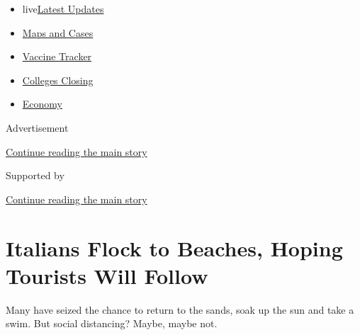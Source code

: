 \begin{itemize}
\tightlist
\item
  live\href{https://www.nytimes3xbfgragh.onion/2020/08/20/world/coronavirus-covid.html?name=styln-coronavirus-national\&region=TOP_BANNER\&variant=undefined\&block=storyline_menu_recirc\&action=click\&pgtype=Article\&impression_id=7a3b1ae0-e389-11ea-8c9e-c99209fb63ac}{Latest
  Updates}
\item
  \href{https://www.nytimes3xbfgragh.onion/interactive/2020/us/coronavirus-us-cases.html?name=styln-coronavirus-national\&region=TOP_BANNER\&variant=undefined\&block=storyline_menu_recirc\&action=click\&pgtype=Article\&impression_id=7a3b1ae1-e389-11ea-8c9e-c99209fb63ac}{Maps
  and Cases}
\item
  \href{https://www.nytimes3xbfgragh.onion/interactive/2020/science/coronavirus-vaccine-tracker.html?name=styln-coronavirus-national\&region=TOP_BANNER\&variant=undefined\&block=storyline_menu_recirc\&action=click\&pgtype=Article\&impression_id=7a3b1ae2-e389-11ea-8c9e-c99209fb63ac}{Vaccine
  Tracker}
\item
  \href{https://www.nytimes3xbfgragh.onion/2020/08/19/us/colleges-closing-covid.html?name=styln-coronavirus-national\&region=TOP_BANNER\&variant=undefined\&block=storyline_menu_recirc\&action=click\&pgtype=Article\&impression_id=7a3b1ae3-e389-11ea-8c9e-c99209fb63ac}{Colleges
  Closing}
\item
  \href{https://www.nytimes3xbfgragh.onion/live/2020/08/20/business/stock-market-today-coronavirus?name=styln-coronavirus-national\&region=TOP_BANNER\&variant=undefined\&block=storyline_menu_recirc\&action=click\&pgtype=Article\&impression_id=7a3b1ae4-e389-11ea-8c9e-c99209fb63ac}{Economy}
\end{itemize}

Advertisement

\protect\hyperlink{after-top}{Continue reading the main story}

Supported by

\protect\hyperlink{after-sponsor}{Continue reading the main story}

\hypertarget{italians-flock-to-beaches-hoping-tourists-will-follow}{%
\section{Italians Flock to Beaches, Hoping Tourists Will
Follow}\label{italians-flock-to-beaches-hoping-tourists-will-follow}}

Many have seized the chance to return to the sands, soak up the sun and
take a swim. But social distancing? Maybe, maybe not.

